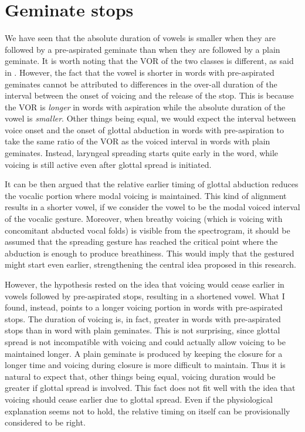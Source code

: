 \documentclass[11pt,a4paper,openany]{memoir}\usepackage[]{graphicx}\usepackage[]{color}
\begin{document}
\section{Geminate stops}
We have seen that the absolute duration of vowels is smaller when they are followed by a pre-aspirated geminate than when they are followed by a plain geminate.
It is worth noting that the VOR of the two classes is different, as said in .
However, the fact that the vowel is shorter in words with pre-aspirated geminates cannot be attributed to differences in the over-all duration of the interval between the onset of voicing and the release of the stop.
This is because the VOR is \textit{longer} in words with aspiration while the absolute duration of the vowel is \textit{smaller}.
Other things being equal, we would expect the interval between voice onset and the onset of glottal abduction in words with pre-aspiration to take the same ratio of the VOR as the voiced interval in words with plain geminates.
Instead, laryngeal spreading starts quite early in the word, while voicing is still active even after glottal spread is initiated.

It can be then argued that the relative earlier timing of glottal abduction reduces the vocalic portion where modal voicing is maintained.
This kind of alignment results in a shorter vowel, if we consider the vowel to be the modal voiced interval of the vocalic gesture.
Moreover, when breathy voicing (which is voicing with concomitant abducted vocal folds) is visible from the spectrogram, it should be assumed that the spreading gesture has reached the critical point where the abduction is enough to produce breathiness.
This would imply that the gestured might start even earlier, strengthening the central idea proposed in this research.

However, the hypothesis rested on the idea that voicing would cease earlier in vowels followed by pre-aspirated stops, resulting in a shortened vowel.
What I found, instead, points to a longer voicing portion in words with pre-aspirated stops.
The duration of voicing is, in fact, greater in words with pre-aspirated stops than in word with plain geminates.
This is not surprising, since glottal spread is not incompatible with voicing and could actually allow voicing to be maintained longer.
A plain geminate is produced by keeping the closure for a longer time and voicing during closure is more difficult to maintain.
Thus it is natural to expect that, other things being equal, voicing duration would be greater if glottal spread is involved.
This fact does not fit well with the idea that voicing should cease earlier due to glottal spread.
Even if the physiological explanation seems not to hold, the relative timing on itself can be provisionally considered to be right.
\end{document}
